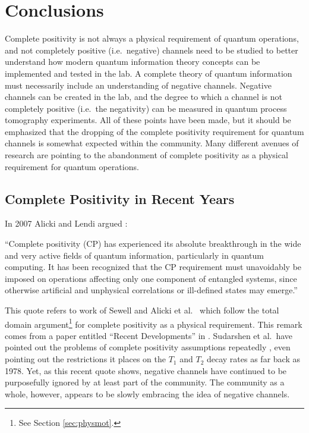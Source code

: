 \chapter{Conclusions}

Complete positivity is not always a  physical requirement of quantum operations, and not completely positive (i.e.\ negative) channels need to be studied to better understand how modern quantum information theory concepts can be implemented and tested in the lab.  A complete theory of quantum information must necessarily include an understanding of negative channels.  Negative channels can be created in the lab, and the degree to which a channel is not completely positive (i.e.\ the negativity) can be measured in quantum process tomography experiments.  All of these points have been made, but it should be emphasized that the dropping of the complete positivity requirement for quantum channels is somewhat expected within the community.  Many different avenues of research are pointing to the abandonment of complete positivity as a physical requirement for quantum operations.

\section{Complete Positivity in Recent Years}

In 2007 Alicki and Lendi argued \cite{Alicki2007}:

``Complete positivity (CP) has experienced its absolute breakthrough in the wide and very active fields of quantum information, particularly in quantum computing. It has been recognized that the CP requirement must unavoidably be imposed on operations affecting only one component of entangled systems, since otherwise artificial and unphysical correlations or ill-defined states may emerge.''

This quote refers to work of Sewell \cite{Sewell2002} and Alicki et al.\ \cite{Alicki2001} which follow the total domain argument\footnote{See Section \ref{sec:physmot}.} for complete positivity as a physical requirement.  This remark comes from a paper entitled ``Recent Developments'' in \cite{Alicki2007}.  Sudarshen et al.\ have pointed out the problems of complete positivity assumptions repeatedly \cite{Sudarshan2005} \cite{Rodriguez2008A} \cite{Sudarshan1978} \cite{Sudarshan1976}, even pointing out the restrictions it places on the $T_1$ and $T_2$ decay rates as far back as 1978.  Yet, as this recent quote shows, negative channels have continued to be purposefully ignored by at least part of the community.  The community as a whole, however, appears to be slowly embracing the idea of negative channels.

